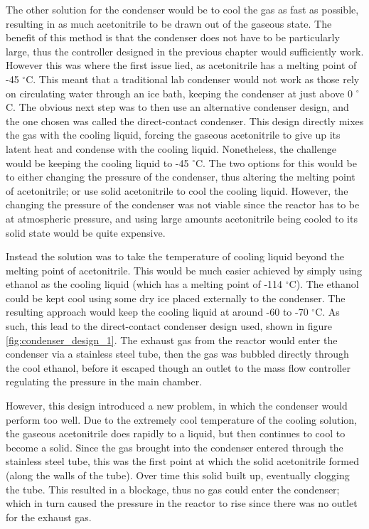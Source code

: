 The other solution for the condenser would be to cool the gas as fast as possible, resulting in as much acetonitrile to be drawn out of the gaseous state. The benefit of this method is that the condenser does not have to be particularly large, thus the controller designed in the previous chapter would sufficiently work. However this was where the first issue lied, as acetonitrile has a melting point of -45 $^{\circ}$C. This meant that a traditional lab condenser would not work as those rely on circulating water through an ice bath, keeping the condenser at just above 0 $^{\circ}$C. The obvious next step was to then use an alternative condenser design, and the one chosen was called the direct-contact condenser. This design directly mixes the gas with the cooling liquid, forcing the gaseous acetonitrile to give up its latent heat and condense with the cooling liquid. Nonetheless, the challenge would be keeping the cooling liquid to -45 $^{\circ}$C. The two options for this would be to either changing the pressure of the condenser, thus altering the melting point of acetonitrile; or use solid acetonitrile to cool the cooling liquid. However, the changing the pressure of the condenser was not viable since the reactor has to be at atmospheric pressure, and using large amounts acetonitrile being cooled to its solid state would be quite expensive. 

Instead the solution was to take the temperature of cooling liquid beyond the melting point of acetonitrile. This would be much easier achieved by simply using ethanol as the cooling liquid (which has a melting point of -114 $^{\circ}$C). The ethanol could be kept cool using some dry ice placed externally to the condenser. The resulting approach would keep the cooling liquid at around -60 to -70 $^{\circ}$C. As such, this lead to the direct-contact condenser design used, shown in figure \ref{fig:condenser_design_1}. The exhaust gas from the reactor would enter the condenser via a stainless steel tube, then the gas was bubbled directly through the cool ethanol, before it escaped though an outlet to the mass flow controller regulating the pressure in the main chamber. 

However, this design introduced a new problem, in which the condenser would perform too well. Due to the extremely cool temperature of the cooling solution, the gaseous acetonitrile does rapidly to a liquid, but then continues to cool to become a solid. Since the gas brought into the condenser entered through the stainless steel tube, this was the first point at which the solid acetonitrile formed (along the walls of the tube). Over time this solid built up, eventually clogging the tube. This resulted in a blockage, thus no gas could enter the condenser; which in turn caused the  pressure in the reactor to rise since there was no outlet for the exhaust gas. 

